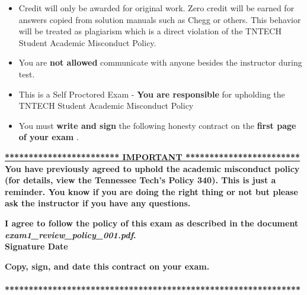 \documentclass[11pt]{article}
\newcommand{\EXAMNUM}{1\hspace{0mm}}
\newcommand{\SECNUM}{001\hspace{0mm}}
\begin{document}
\begin{itemize}
\begin{itemize}
		\item {\B Credit will only be awarded for original work. Zero credit will be earned for answers copied from solution manuals such as Chegg or others. This behavior will be treated as plagiarism which is a direct violation of the TNTECH Student Academic Misconduct Policy.}

		\item  You are {\bf not allowed} communicate with anyone besides the instructor during test. 
		\item This is a Self Proctored Exam - {\bf You are responsible} for upholding the TNTECH Student Academic Misconduct Policy
		\item  You must {\bf write and sign} the following honesty contract on the {\bf first page of your exam }. 
		
		

\end{itemize}


 {\R  \bf \underline{************************ IMPORTANT ************************}} \vspace{3mm}\\
			  {\R \bf You have previously agreed to uphold the academic misconduct policy (for details, view the
Tennessee Tech's Policy 340). This is just a reminder. You know if you are doing the right thing or not but please ask the instructor if you have any questions. }
\begin{framed}
	
	\vspace{3mm}	 \textbf{ I \underline{\hspace{50mm}} agree to follow the policy of this exam \vspc as described in the document {\it exam\EXAMNUM\_review\_policy\_\SECNUM.pdf}.  }\vspace{3mm}\\
		 \textbf{\Large Signature \underline{\hspace{80mm}} Date\underline{\hspace{20mm} }}\\

\end{framed}
			{\R  \bf Copy, sign, and date this contract on your exam. }   \vspace{1mm}\\
			{\R  \bf \underline{\hspace{140mm}}} \\
			{\R  \bf ***************************************************************} 

\newpage


\end{itemize}
\end{document}
